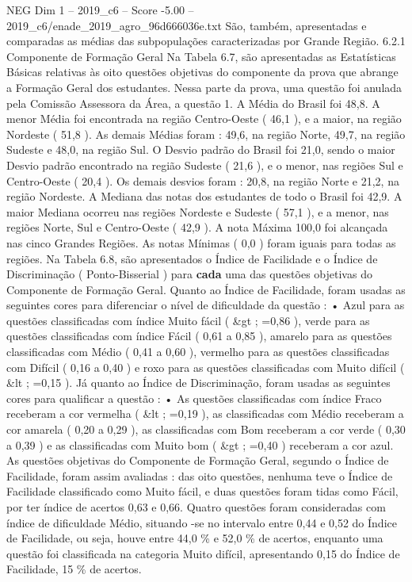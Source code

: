 \begin{textsample}{NEG Dim 1 – 2019\_c6 – Score -5.00 – 2019\_c6/enade\_2019\_agro\_96d666036e.txt}
São, também, apresentadas e comparadas as médias das subpopulações caracterizadas por Grande Região. 6.2.1 Componente de Formação Geral Na Tabela 6.7, são apresentadas as Estatísticas Básicas relativas às oito questões objetivas do componente da prova que abrange a Formação Geral dos estudantes.
Nessa parte da prova, uma questão foi anulada pela Comissão Assessora da Área, a questão 1.
A Média do Brasil foi 48,8.
A menor Média foi encontrada na região Centro-Oeste ( 46,1 ), e a maior, na região Nordeste ( 51,8 ).
As demais Médias foram : 49,6, na região Norte, 49,7, na região Sudeste e 48,0, na região Sul.
O Desvio padrão do Brasil foi 21,0, sendo o maior Desvio padrão encontrado na região Sudeste ( 21,6 ), e o menor, nas regiões Sul e Centro-Oeste ( 20,4 ).
Os demais desvios foram : 20,8, na região Norte e 21,2, na região Nordeste.
A Mediana das notas dos estudantes de todo o Brasil foi 42,9.
A maior Mediana ocorreu nas regiões Nordeste e Sudeste ( 57,1 ), e a menor, nas regiões Norte, Sul e Centro-Oeste ( 42,9 ).
A nota Máxima 100,0 foi alcançada nas cinco Grandes Regiões.
As notas Mínimas ( 0,0 ) foram iguais para todas as regiões.
Na Tabela 6.8, são apresentados o Índice de Facilidade e o Índice de Discriminação ( Ponto-Bisserial ) para \textbf{cada} uma das questões objetivas do Componente de Formação Geral.
Quanto ao Índice de Facilidade, foram usadas as seguintes cores para diferenciar o nível de dificuldade da questão : • Azul para as questões classificadas com índice Muito fácil ( \&gt ; =0,86 ), verde para as questões classificadas com índice Fácil ( 0,61 a 0,85 ), amarelo para as questões classificadas com Médio ( 0,41 a 0,60 ), vermelho para as questões classificadas com Difícil ( 0,16 a 0,40 ) e roxo para as questões classificadas com Muito difícil ( \&lt ; =0,15 ).
Já quanto ao Índice de Discriminação, foram usadas as seguintes cores para qualificar a questão : • As questões classificadas com índice Fraco receberam a cor vermelha ( \&lt ; =0,19 ), as classificadas com Médio receberam a cor amarela ( 0,20 a 0,29 ), as classificadas com Bom receberam a cor verde ( 0,30 a 0,39 ) e as classificadas com Muito bom ( \&gt ; =0,40 ) receberam a cor azul.
As questões objetivas do Componente de Formação Geral, segundo o Índice de Facilidade, foram assim avaliadas : das oito questões, nenhuma teve o Índice de Facilidade classificado como Muito fácil, e duas questões foram tidas como Fácil, por ter índice de acertos 0,63 e 0,66.
Quatro questões foram consideradas com índice de dificuldade Médio, situando -se no intervalo entre 0,44 e 0,52 do Índice de Facilidade, ou seja, houve entre 44,0 \% e 52,0 \% de acertos, enquanto uma questão foi classificada na categoria Muito difícil, apresentando 0,15 do Índice de Facilidade, 15 \% de acertos.

\end{textsample}
